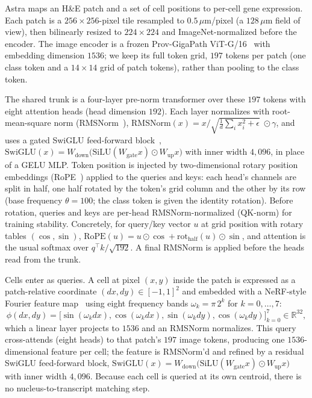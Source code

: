 \documentclass[11pt]{article}
\begin{document}
Astra maps an H\&E patch and a set of cell positions to per-cell gene
expression. Each patch is a $256\times256$-pixel tile resampled to
$0.5\,\mu$m/pixel (a $128\,\mu$m field of view), then bilinearly resized to
$224\times224$ and ImageNet-normalized before the encoder. The image encoder is
a frozen Prov-GigaPath ViT-G/16~\cite{gigapath} with embedding dimension
$1536$; we keep its full token grid, $197$ tokens per patch (one class token and
a $14\times14$ grid of patch tokens), rather than pooling to the class token.

The shared trunk is a four-layer pre-norm transformer over these $197$ tokens
with eight attention heads (head dimension $192$). Each layer normalizes with
root-mean-square norm (RMSNorm~\cite{rmsnorm}),
$\mathrm{RMSNorm}(x)=x/\sqrt{\tfrac{1}{d}\sum_i x_i^2+\epsilon}\;\odot\gamma$,
and uses a gated SwiGLU feed-forward block~\cite{swiglu_shazeer},
$\mathrm{SwiGLU}(x)=W_{\mathrm{down}}\big(\mathrm{SiLU}(W_{\mathrm{gate}}x)\odot
W_{\mathrm{up}}x\big)$ with inner width $4{,}096$, in place of a GELU MLP. Token
position is injected by two-dimensional rotary position embeddings
(RoPE~\cite{rope_su}) applied
to the queries and keys: each head's channels are split in half, one half rotated
by the token's grid column and the other by its row (base frequency $\theta=100$;
the class token is given the identity rotation). Before rotation, queries and
keys are per-head RMSNorm-normalized (QK-norm) for training stability. Concretely,
for query/key vector $u$ at grid position with rotary tables $(\cos,\sin)$,
$\mathrm{RoPE}(u)=u\odot\cos+\mathrm{rot}_{\text{half}}(u)\odot\sin$, and
attention is the usual softmax over $q^{\top}k/\sqrt{192}$. A final RMSNorm is
applied before the heads read from the trunk.

Cells enter as queries. A cell at pixel $(x,y)$ inside the patch is expressed as
a patch-relative coordinate $(dx,dy)\in[-1,1]^2$ and embedded with a
NeRF-style Fourier feature map~\cite{tancik_fourier} using eight frequency bands
$\omega_k=\pi\,2^{k}$ for $k=0,\dots,7$:
\[
\phi(dx,dy)=\big[\sin(\omega_k dx),\cos(\omega_k dx),
\sin(\omega_k dy),\cos(\omega_k dy)\big]_{k=0}^{7}\in\mathbb{R}^{32},
\]
which a linear layer projects to $1536$ and an RMSNorm normalizes. This query
cross-attends (eight heads) to that patch's $197$ image tokens, producing one
$1536$-dimensional feature per cell; the feature is RMSNorm'd and refined by a
residual SwiGLU feed-forward block,
$\mathrm{SwiGLU}(x)=W_{\mathrm{down}}\big(\mathrm{SiLU}(W_{\mathrm{gate}}x)\odot
W_{\mathrm{up}}x\big)$ with inner width $4{,}096$. Because each cell is queried
at its own centroid, there is no nucleus-to-transcript matching step.
\end{document}
